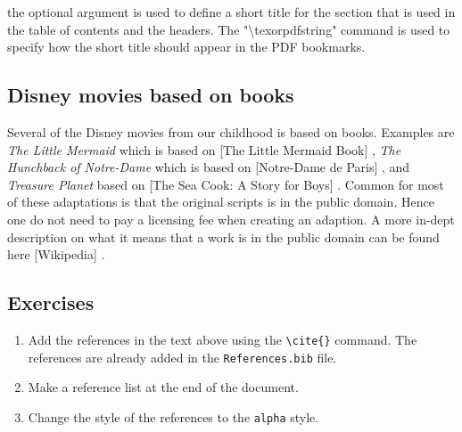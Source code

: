 \documentclass[12pt,titlepage]{article}
\begin{document}
the optional argument is used to define a short title for the section that is used in the table of contents and the headers. The "\textbackslash texorpdfstring" command is used to specify how the short title should appear in the PDF bookmarks.

\newpage
\subsection{Disney movies based on books}

Several of the Disney movies from our childhood is based on books. Examples are \textit{The Little Mermaid} which is based on [The Little Mermaid Book] \cite{andersen1964little}, \textit{The Hunchback of Notre-Dame} which is based on [Notre-Dame de Paris] \cite{hugo2012hunchback} , and \textit{Treasure Planet} based on [The Sea Cook: A Story for Boys] \cite{stevenson1883sea}. Common for most of these adaptations is that the original scripts is in the public domain. Hence one do not need to pay a licensing fee when creating an adaption. A more in-dept description on what it means that a work is in the public domain can be found here [Wikipedia] \cite{wiki:xxx}.

\subsection{Exercises}
\begin{enumerate}
    \item Add the references in the text above using the \verb+\cite{}+ command. The references are already added in the \texttt{References.bib} file.
    \item Make a reference list at the end of the document.
    \item Change the style of the references to the \texttt{alpha} style.
\end{enumerate}



\end{document}
